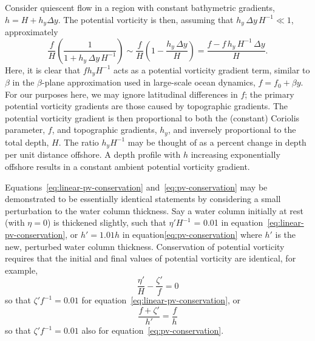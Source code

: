 \documentclass[11pt]{report}
\numberwithin{equation}{section}
\begin{document}
Consider quiescent flow in a region with constant bathymetric gradients, $h = H + h_y \Delta y$.  The potential vorticity is then, assuming that $h_y\,\Delta y\,H^{-1} \ll 1$, approximately
\begin{equation}
    \frac{f}{H} \left( \frac{1}{1 + h_y\,\Delta y\,H^{-1}} \right)
        \sim \frac{f}{H}\left(1 - \frac{h_y\,\Delta y}{H}\right)
        = \frac{f - f\,h_y\,H^{-1}\,\Delta y }{H}.
\end{equation}
Here, it is clear that $f h_y H^{-1}$ acts as a potential vorticity gradient term, similar to $\beta$ in the $\beta$-plane approximation used in large-scale ocean dynamics, $f=f_0+\beta y$.  For our purposes here, we may ignore latitudinal differences in $f$; the primary potential vorticity gradients are those caused by topographic gradients.  The potential vorticity gradient is then proportional to both the (constant) Coriolis parameter, $f$, and topographic gradients, $h_y$, and inversely proportional to the total depth, $H$.  The ratio $h_y H^{-1}$ may be thought of as a percent change in depth per unit distance offshore.  A depth profile with $h$ increasing exponentially offshore results in a constant ambient potential vorticity gradient.

Equations~\ref{eq:linear-pv-conservation} and~\ref{eq:pv-conservation} may be demonstrated to be essentially identical statements by considering a small perturbation to the water column thickness.  Say a water column initially at rest (with $\eta=0$) is thickened slightly, such that $\eta' H^{-1}$ = 0.01 in equation~\ref{eq:linear-pv-conservation}, or $h' = 1.01 h$ in equation\ref{eq:pv-conservation} where $h'$ is the new, perturbed water column thickness.  Conservation of potential vorticity requires that the initial and final values of potential vorticity are identical, for example,
\begin{equation}
    \frac{\eta'}{H} - \frac{\zeta'}{f} = 0
\end{equation}
so that $\zeta' f^{-1} = 0.01$ for equation~\ref{eq:linear-pv-conservation}, or
\begin{equation}
    \frac{f + \zeta'}{h'} = \frac{f}{h}
\end{equation}
so that $\zeta' f^{-1} = 0.01$ also for equation~\ref{eq:pv-conservation}.
\end{document}
